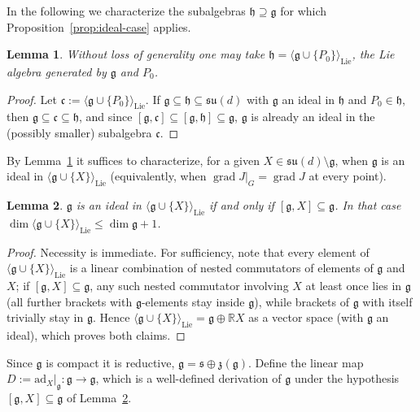 \documentclass{article}
\newtheorem{lemma}{Lemma}
\begin{document}
In the following we characterize the subalgebras $\mathfrak h\supseteq\mathfrak g$ for which Proposition~\ref{prop:ideal-case} applies.

\begin{lemma}
\label{lem:minimal-h}
Without loss of generality one may take $\mathfrak h = \langle \mathfrak g \cup \{P_0\}\rangle_{\mathrm{Lie}}$, the Lie algebra generated by $\mathfrak g$ and $P_0$.
\end{lemma}
\begin{proof}
Let $\mathfrak c := \langle \mathfrak g \cup \{P_0\}\rangle_{\mathrm{Lie}}$. If $\mathfrak g\subseteq\mathfrak h\subseteq\mathfrak{su}(d)$ with $\mathfrak g$ an ideal in $\mathfrak h$ and $P_0\in\mathfrak h$, then $\mathfrak g\subseteq\mathfrak c\subseteq\mathfrak h$, and since $[\mathfrak g,\mathfrak c]\subseteq[\mathfrak g,\mathfrak h]\subseteq\mathfrak g$, $\mathfrak g$ is already an ideal in the (possibly smaller) subalgebra $\mathfrak c$.
\end{proof}

By Lemma~\ref{lem:minimal-h} it suffices to characterize, for a given $X\in\mathfrak{su}(d)\setminus\mathfrak g$, when $\mathfrak g$ is an ideal in $\langle \mathfrak g\cup\{X\}\rangle_{\mathrm{Lie}}$ (equivalently, when $\operatorname{grad} J\vert_G = \operatorname{grad} J$ at every point).

\begin{lemma}
\label{lem:necessary-sufficient-ideal}
$\mathfrak g$ is an ideal in $\langle \mathfrak g \cup \{X\}\rangle_{\mathrm{Lie}}$ if and only if $[\mathfrak g,X]\subseteq\mathfrak g$. In that case $\dim \langle \mathfrak g\cup\{X\}\rangle_{\mathrm{Lie}} \le \dim\mathfrak g + 1$.
\end{lemma}
\begin{proof}
Necessity is immediate. For sufficiency, note that every element of $\langle \mathfrak g\cup\{X\}\rangle_{\mathrm{Lie}}$ is a linear combination of nested commutators of elements of $\mathfrak g$ and $X$; if $[\mathfrak g,X]\subseteq\mathfrak g$, any such nested commutator involving $X$ at least once lies in $\mathfrak g$ (all further brackets with $\mathfrak g$-elements stay inside $\mathfrak g$), while brackets of $\mathfrak g$ with itself trivially stay in $\mathfrak g$. Hence $\langle \mathfrak g\cup\{X\}\rangle_{\mathrm{Lie}} = \mathfrak g \oplus \mathbb R X$ as a vector space (with $\mathfrak g$ an ideal), which proves both claims.
\end{proof}

Since $\mathfrak g$ is compact it is reductive, $\mathfrak g=\mathfrak s\oplus\mathfrak z(\mathfrak g)$. Define the linear map $D:=\mathrm{ad}_X\vert_{\mathfrak g}:\mathfrak g\to\mathfrak g$, which is a well-defined derivation of $\mathfrak g$ under the hypothesis $[\mathfrak g,X]\subseteq\mathfrak g$ of Lemma~\ref{lem:necessary-sufficient-ideal}.
\end{document}
